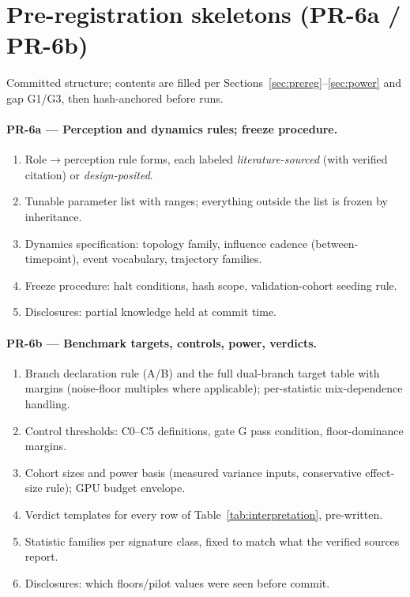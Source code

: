 \documentclass[12pt, letterpaper]{article}
\begin{document}
\appendix
\section{Pre-registration skeletons (PR-6a / PR-6b)}
\label{app:prereg}

Committed structure; contents are filled per Sections~\ref{sec:prereg}--\ref{sec:power} and gap G1/G3, then hash-anchored before runs.

\paragraph{PR-6a --- Perception and dynamics rules; freeze procedure.}
\begin{enumerate}[nosep]
    \item Role$\to$perception rule forms, each labeled \emph{literature-sourced} (with verified citation) or \emph{design-posited}.
    \item Tunable parameter list with ranges; everything outside the list is frozen by inheritance.
    \item Dynamics specification: topology family, influence cadence (between-timepoint), event vocabulary, trajectory families.
    \item Freeze procedure: halt conditions, hash scope, validation-cohort seeding rule.
    \item Disclosures: partial knowledge held at commit time.
\end{enumerate}

\paragraph{PR-6b --- Benchmark targets, controls, power, verdicts.}
\begin{enumerate}[nosep]
    \item Branch declaration rule (A/B) and the full dual-branch target table with margins (noise-floor multiples where applicable); per-statistic mix-dependence handling.
    \item Control thresholds: C0--C5 definitions, gate G pass condition, floor-dominance margins.
    \item Cohort sizes and power basis (measured variance inputs, conservative effect-size rule); GPU budget envelope.
    \item Verdict templates for every row of Table~\ref{tab:interpretation}, pre-written.
    \item Statistic families per signature class, fixed to match what the verified sources report.
    \item Disclosures: which floors/pilot values were seen before commit.
\end{enumerate}

\printbibliography
\end{document}
